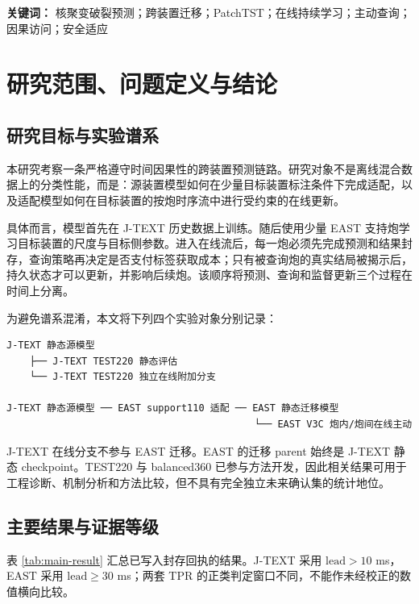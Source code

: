 \documentclass[11pt,a4paper]{article}
\begin{document}
\noindent\textbf{关键词：} 核聚变破裂预测；跨装置迁移；PatchTST；在线持续学习；主动查询；因果访问；安全适应

\tableofcontents
\newpage

\section{研究范围、问题定义与结论}

\subsection{研究目标与实验谱系}

本研究考察一条严格遵守时间因果性的跨装置预测链路。研究对象不是离线混合数据上的分类性能，而是：源装置模型如何在少量目标装置标注条件下完成适配，以及适配模型如何在目标装置的按炮时序流中进行受约束的在线更新。

具体而言，模型首先在 J-TEXT 历史数据上训练。随后使用少量 EAST 支持炮学习目标装置的尺度与目标侧参数。进入在线流后，每一炮必须先完成预测和结果封存，查询策略再决定是否支付标签获取成本；只有被查询炮的真实结局被揭示后，持久状态才可以更新，并影响后续炮。该顺序将预测、查询和监督更新三个过程在时间上分离。

为避免谱系混淆，本文将下列四个实验对象分别记录：

\begin{lstlisting}
J-TEXT 静态源模型
    ├── J-TEXT TEST220 静态评估
    └── J-TEXT TEST220 独立在线附加分支

J-TEXT 静态源模型 ── EAST support110 适配 ── EAST 静态迁移模型
                                           └── EAST V3C 炮内/炮间在线主动
\end{lstlisting}

J-TEXT 在线分支不参与 EAST 迁移。EAST 的迁移 parent 始终是 J-TEXT 静态 checkpoint。TEST220 与 balanced360 已参与方法开发，因此相关结果可用于工程诊断、机制分析和方法比较，但不具有完全独立未来确认集的统计地位。

\subsection{主要结果与证据等级}

表 \ref{tab:main-result} 汇总已写入封存回执的结果。J-TEXT 采用
\(\mathrm{lead}>10\) ms，EAST 采用 \(\mathrm{lead}\geq30\) ms；两套
TPR 的正类判定窗口不同，不能作未经校正的数值横向比较。
\end{document}
